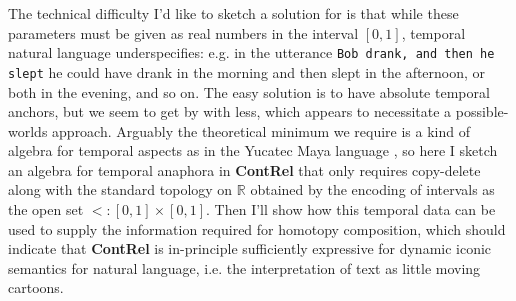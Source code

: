 The technical difficulty I'd like to sketch a solution for is that while these parameters must be given as real numbers in the interval $[0,1]$, temporal natural language underspecifies: e.g. in the utterance \texttt{Bob drank, and then he slept} he could have drank in the morning and then slept in the afternoon, or both in the evening, and so on. The easy solution is to have absolute temporal anchors, but we seem to get by with less, which appears to necessitate a possible-worlds approach. Arguably the theoretical minimum we require is a kind of algebra for temporal aspects as in the Yucatec Maya language \citep{bohnemeyerTemporalAnaphoraTenseless2009a}, so here I sketch an algebra for temporal anaphora in \textbf{ContRel} that only requires copy-delete along with the standard topology on $\mathbb{R}$ obtained by the encoding of intervals as the open set $<: [0,1] \times [0,1]$. Then I'll show how this temporal data can be used to supply the information required for homotopy composition, which should indicate that \textbf{ContRel} is in-principle sufficiently expressive for dynamic iconic semantics for natural language, i.e. the interpretation of text as little moving cartoons.

